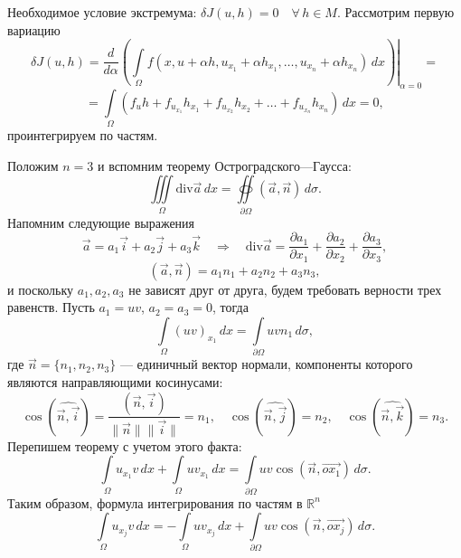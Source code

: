 \documentclass[12pt,a5paper]{book}
\begin{document}
	Необходимое условие экстремума: $\delta J(u,h) = 0 \quad \forall\,h \in M$. Рассмотрим первую вариацию
	\begin{equation*}
		\delta J(u,h) = \left.\frac{d}{d\alpha}\left(\int\limits_\Omega f(x, u + \alpha h, u_{x_1} + \alpha h_{x_1}, \dots, u_{x_n} + \alpha h_{x_n})\,dx\right)\right|_{\alpha=0} =
	\end{equation*}
	\begin{equation*}
		= \int\limits_\Omega \left(f_uh + f_{u_{x_1}}h_{x_1} + f_{u_{x_2}}h_{x_2} + \dots + f_{u_{x_n}}h_{x_n}\right)\,dx = 0,
	\end{equation*}
	проинтегрируем по частям.
	
	Положим $n = 3$ и вспомним теорему Остроградского---Гаусса:
	\begin{equation*}
		\iiint\limits_\Omega \text{div}\vec{a}\,dx = \oiint\limits_{\partial\Omega}\left(\vec{a},\vec{n}\right)\,d\sigma.
	\end{equation*}
	Напомним следующие выражения
	\begin{equation*}
		\vec{a} = a_1\vec{i} + a_2\vec{j} + a_3\vec{k} \quad \Rightarrow \quad \text{div}\vec{a} = \frac{\partial a_1}{\partial x_1} + \frac{\partial a_2}{\partial x_2} + \frac{\partial a_3}{\partial x_3},
	\end{equation*}
	\begin{equation*}
		\left(\vec{a},\vec{n}\right) = a_1n_1 + a_2n_2 + a_3n_3,
	\end{equation*}
	и поскольку $a_1, a_2, a_3$ не зависят друг от друга, будем требовать верности трех равенств. Пусть $a_1 = uv$, $a_2 = a_3 = 0$, тогда
	\begin{equation*}
		\int\limits_\Omega (uv)_{x_1}\,dx = \int\limits_{\partial\Omega} uvn_1\,d\sigma,
	\end{equation*}
	где $\vec{n} = \{n_1, n_2, n_3\}$ --- единичный вектор нормали, компоненты которого являются направляющими косинусами:
	\begin{equation*}
		\cos{\left(\widehat{\vec{n},\vec{i}}\right)} = \frac{\left(\vec{n},\vec{i}\right)}{\|\vec{n}\|\|\vec{i}\|} = n_1, \quad \cos{\left(\widehat{\vec{n},\vec{j}}\right)} = n_2, \quad \cos{\left(\widehat{\vec{n},\vec{k}}\right)} = n_3.
	\end{equation*}
	Перепишем теорему с учетом этого факта:
	\begin{equation*}
		\int\limits_\Omega u_{x_1}v\,dx + \int\limits_\Omega uv_{x_1}\,dx = \int\limits_{\partial\Omega} uv\cos\left(\vec{n},\vec{ox_1}\right)\,d\sigma.
	\end{equation*}	
	Таким образом, формула интегрирования по частям в $\mathbb{R}^n$
	\begin{equation}\label{int_parts}
		\int\limits_\Omega u_{x_j}v\,dx = -\int\limits_\Omega uv_{x_j}\,dx + \int\limits_{\partial\Omega} uv\cos\left(\vec{n},\vec{ox_j}\right)\,d\sigma.
	\end{equation}
	
\end{document}
